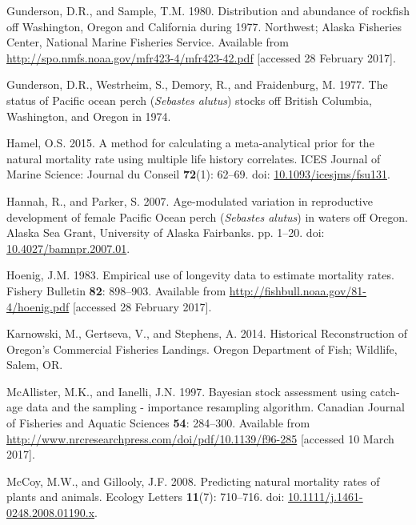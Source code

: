 \documentclass[12pt,]{article}
\begin{document}
\hypertarget{ref-gunderson_distribution_1980}{}
Gunderson, D.R., and Sample, T.M. 1980. Distribution and abundance of
rockfish off Washington, Oregon and California during 1977. Northwest;
Alaska Fisheries Center, National Marine Fisheries Service. Available
from \url{http://spo.nmfs.noaa.gov/mfr423-4/mfr423-42.pdf} {[}accessed
28 February 2017{]}.

\hypertarget{ref-gunderson_status_1977}{}
Gunderson, D.R., Westrheim, S., Demory, R., and Fraidenburg, M. 1977.
The status of Pacific ocean perch (\emph{Sebastes alutus}) stocks off
British Columbia, Washington, and Oregon in 1974.

\hypertarget{ref-hamel_method_2015}{}
Hamel, O.S. 2015. A method for calculating a meta-analytical prior for
the natural mortality rate using multiple life history correlates. ICES
Journal of Marine Science: Journal du Conseil \textbf{72}(1): 62--69.
doi:
\href{https://doi.org/10.1093/icesjms/fsu131}{10.1093/icesjms/fsu131}.

\hypertarget{ref-hannah_age-modulated_2007}{}
Hannah, R., and Parker, S. 2007. Age-modulated variation in reproductive
development of female Pacific Ocean perch (\emph{Sebastes alutus}) in
waters off Oregon. Alaska Sea Grant, University of Alaska Fairbanks. pp.
1--20. doi:
\href{https://doi.org/10.4027/bamnpr.2007.01}{10.4027/bamnpr.2007.01}.

\hypertarget{ref-hoenig_empirical_1983}{}
Hoenig, J.M. 1983. Empirical use of longevity data to estimate mortality
rates. Fishery Bulletin \textbf{82}: 898--903. Available from
\url{http://fishbull.noaa.gov/81-4/hoenig.pdf} {[}accessed 28 February
2017{]}.

\hypertarget{ref-karnowski_historical_2014}{}
Karnowski, M., Gertseva, V., and Stephens, A. 2014. Historical
Reconstruction of Oregon's Commercial Fisheries Landings. Oregon
Department of Fish; Wildlife, Salem, OR.

\hypertarget{ref-mcallister_bayesian_1997}{}
McAllister, M.K., and Ianelli, J.N. 1997. Bayesian stock assessment
using catch-age data and the sampling - importance resampling algorithm.
Canadian Journal of Fisheries and Aquatic Sciences \textbf{54}:
284--300. Available from
\url{http://www.nrcresearchpress.com/doi/pdf/10.1139/f96-285}
{[}accessed 10 March 2017{]}.

\hypertarget{ref-mccoy_predicting_2008}{}
McCoy, M.W., and Gillooly, J.F. 2008. Predicting natural mortality rates
of plants and animals. Ecology Letters \textbf{11}(7): 710--716. doi:
\href{https://doi.org/10.1111/j.1461-0248.2008.01190.x}{10.1111/j.1461-0248.2008.01190.x}.
\end{document}
